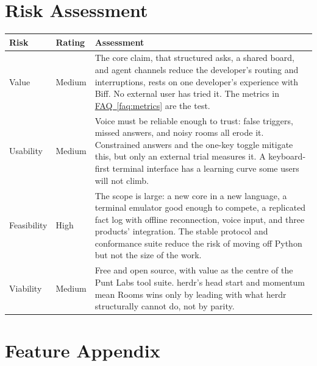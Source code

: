 \documentclass[11pt,letterpaper]{article}
\newcommand{\product}{Rooms}
\newcommand{\faqref}[1]{\hyperref[#1]{FAQ~\ref*{#1}}}
\begin{document}

\newpage
\section*{Risk Assessment}

\renewcommand{\arraystretch}{1.6}
\begin{tabularx}{\textwidth}{@{} l l X @{}}
\toprule
\textbf{\color{SectionBlue}Risk} & \textbf{\color{SectionBlue}Rating} & \textbf{\color{SectionBlue}Assessment} \\
\midrule
Value & \textcolor{RiskAmber}{Medium} &
  The core claim, that structured asks, a shared board, and agent channels
  reduce the developer's routing and interruptions, rests on one developer's
  experience with Biff. No external user has tried it. The metrics in
  \faqref{faq:metrics} are the test. \\
Usability & \textcolor{RiskAmber}{Medium} &
  Voice must be reliable enough to trust: false triggers, missed answers,
  and noisy rooms all erode it. Constrained answers and the one-key toggle
  mitigate this, but only an external trial measures it. A keyboard-first
  terminal interface has a learning curve some users will not climb. \\
Feasibility & \textcolor{RiskRed}{High} &
  The scope is large: a new core in a new language, a terminal emulator good
  enough to compete, a replicated fact log with offline reconnection, voice
  input, and three products' integration. The stable protocol and conformance
  suite reduce the risk of moving off Python but not the size of the work. \\
Viability & \textcolor{RiskAmber}{Medium} &
  Free and open source, with value as the centre of the Punt Labs tool suite.
  herdr's head start and momentum mean \product{} wins only by leading with
  what herdr structurally cannot do, not by parity. \\
\bottomrule
\end{tabularx}
\renewcommand{\arraystretch}{1.0}


\section*{Feature Appendix}
\end{document}
